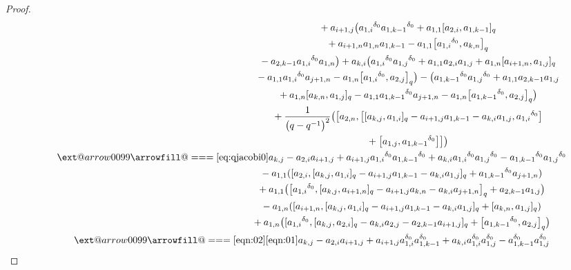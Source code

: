 \documentclass[10pt,a4paper]{amsart}
\makeatletter
\def\x@arrow{\DOTSB\Relbar}
\def\xlongequalsignfill@{\arrowfill@\x@arrow\Relbar\x@arrow}
\providecommand{\xlongequal}[2][]{%
	\ext@arrow 0099\xlongequalsignfill@{#1}{#2}}
\numberwithin{equation}{section}
\def\d{\delta}
\makeatother
\begin{document}
\begin{proof}
\begin{gather*}
 \phantom{\qquad \xlongequal{\qquad}\quad\ }{} +a_{i+1,j} \bigl({a_{1,i}}^{\d_0}{a_{1,k-1}}^{\d_0}+a_{1,1} [a_{2,i},a_{1,k-1} ]_q\\
 \phantom{\qquad \xlongequal{\qquad}\quad\ }{}
+a_{i+1,n}a_{1,n}a_{1,k-1} -a_{1,1} \bigl[{a_{1,i}}^{\d_0},a_{k,n} \bigr]_q \\
 \phantom{\qquad \xlongequal{\qquad}\quad\ }{} -a_{2,k-1}{a_{1,i}}^{\d_0}a_{1,n} \bigr)+a_{k,i} \bigl({a_{1,i}}^{\d_0}{a_{1,j}}^{\d_0}+a_{1,1}a_{2,i}a_{1,j} +a_{1,n} [a_{i+1,n},a_{1,j} ]_q \\
 \phantom{\qquad \xlongequal{\qquad}\quad\ }{} -a_{1,1}{a_{1,i}}^{\d_0}a_{j+1,n} -a_{1,n} \bigl[{a_{1,i}}^{\d_0},a_{2,j} \bigr]_q \bigr)- \bigl({a_{1,k-1}}^{\d_0}{a_{1,j}}^{\d_0} +a_{1,1}a_{2,k-1}a_{1,j}\\
 \phantom{\qquad \xlongequal{\qquad}\quad\ }{}
+a_{1,n} [a_{k,n},a_{1,j} ]_q -a_{1,1}{a_{1,k-1}}^{\d_0}a_{j+1,n} -a_{1,n} \bigl[{a_{1,k-1}}^{\d_0},a_{2,j} \bigr]_q \bigr)\\
 \phantom{\qquad \xlongequal{\qquad}\quad\ }{} +\frac{1}{ \bigl(q-q^{-1}\bigr)^2} \bigl( \bigl[a_{2,n}, \bigl[ [a_{k,j},a_{1,i} ]_q-a_{i+1,j}a_{1,k-1} -a_{k,i}a_{1,j}, {a_{1,i}}^{\d_0} \bigr]\\
 \phantom{\qquad \xlongequal{\qquad}\quad\ }{} + \bigl[a_{1,j}, {a_{1,k-1}}^{\d_0} \bigr] \bigr] \bigr)\\
 \qquad\xlongequal{\eqref{eq:qjacobi0}} a_{k,j}-a_{2,i}a_{i+1,j} +a_{i+1,j}{a_{1,i}}^{\d_0} {a_{1,k-1}}^{\d_0} +a_{k,i}{a_{1,i}}^{\d_0}{a_{1,j}}^{\d_0}-{a_{1,k-1}}^{\d_0}{a_{1,j}}^{\d_0}\\
 \phantom{\qquad \xlongequal{\qquad}}{} -a_{1,1} ( [a_{2,i}, [a_{k,j},a_{1,i} ]_q -a_{i+1,j}a_{1,k-1}-a_{k,i}a_{1,j} ]_q+{a_{1,k-1}}^{\d_0}a_{j+1,n} )\\
 \phantom{\qquad \xlongequal{\qquad}}{} +a_{1,1} \bigl( \bigl[{a_{1,i}}^{\d_0}, [a_{k,j},a_{i+1,n} ]_q -a_{i+1,j}a_{k,n} -a_{k,i}a_{j+1,n} \bigr]_q+a_{2,k-1}a_{1,j} \bigr) \\
 \phantom{\qquad \xlongequal{\qquad}}{} -a_{1,n} ( [a_{i+1,n}, [a_{k,j},a_{1,i} ]_q -a_{i+1,j}a_{1,k-1}-a_{k,i}a_{1,j} ]_q + [a_{k,n},a_{1,j} ]_q )\\
 \phantom{\qquad \xlongequal{\qquad}}{} +a_{1,n} \bigl( [{a_{1,i}}^{\d_0}, [a_{k,j},a_{2,i} ]_q -a_{k,i}a_{2,j} -a_{2,k-1}a_{i+1,j} ]_q + \bigl[{a_{1,k-1}}^{\d_0},a_{2,j} \bigr]_q \bigr)\\
 \qquad\xlongequal[\eqref{eqn:02}]{\eqref{eqn:01}}
 a_{k,j}-a_{2,i}a_{i+1,j}+a_{i+1,j}a_{1,i}^{\d_0}a_{1,k-1}^{\d_0} +a_{k,i} a_{1,i}^{\d_0}a_{1,j}^{\d_0} - a_{1,k-1}^{\d_0}a_{1,j}^{\d_0}\\

\end{gather*}
\end{proof}
\end{document}
